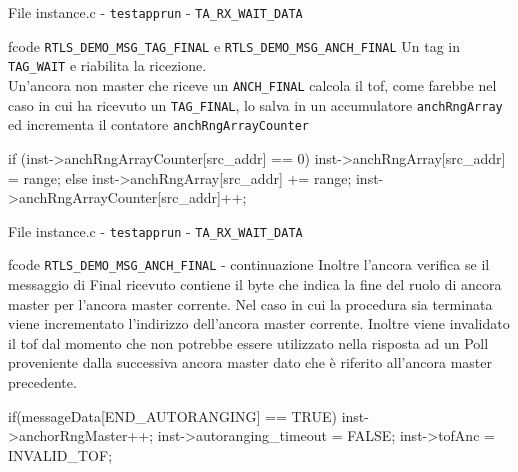 \begin{frame}[fragile]{File instance.c - \lstinline[language=C]!testapprun! - \lstinline[language=C]!TA_RX_WAIT_DATA!}
  \begin{block}{fcode \lstinline[language=C]!RTLS_DEMO_MSG_TAG_FINAL! e \lstinline[language=C]!RTLS_DEMO_MSG_ANCH_FINAL!}
    Un tag in \lstinline[language=C]!TAG_WAIT! e riabilita la ricezione.\\
    Un'ancora non master che riceve un \lstinline[language=C]!ANCH_FINAL! calcola il tof, come
    farebbe nel caso in cui ha ricevuto un \lstinline[language=C]!TAG_FINAL!, lo salva in un accumulatore
    \lstinline[language=C]!anchRngArray! ed incrementa il contatore \lstinline[language=C]!anchRngArrayCounter!
    \begin{C}
      if (inst->anchRngArrayCounter[src_addr] == 0)
        inst->anchRngArray[src_addr] = range;
      else 
        inst->anchRngArray[src_addr] += range;
      inst->anchRngArrayCounter[src_addr]++;
    \end{C}
  \end{block}
\end{frame}

\begin{frame}[fragile]{File instance.c - \lstinline[language=C]!testapprun! - \lstinline[language=C]!TA_RX_WAIT_DATA!}
  \begin{block}{fcode \lstinline[language=C]!RTLS_DEMO_MSG_ANCH_FINAL! - continuazione}
    Inoltre l'ancora verifica se il messaggio di Final ricevuto contiene
    il byte che indica la fine del ruolo di ancora master per l'ancora
    master corrente. Nel caso in cui la procedura sia terminata viene incrementato
    l'indirizzo dell'ancora master corrente. Inoltre \alert{viene invalidato} il tof
    dal momento che non potrebbe essere utilizzato nella risposta ad un Poll proveniente
    dalla successiva ancora master dato che è riferito all'ancora master precedente.
    \begin{C}
      if(messageData[END_AUTORANGING] == TRUE)
      {
        inst->anchorRngMaster++;
        inst->autoranging_timeout = FALSE;
        inst->tofAnc = INVALID_TOF;
      }
    \end{C}
  \end{block}
\end{frame}

